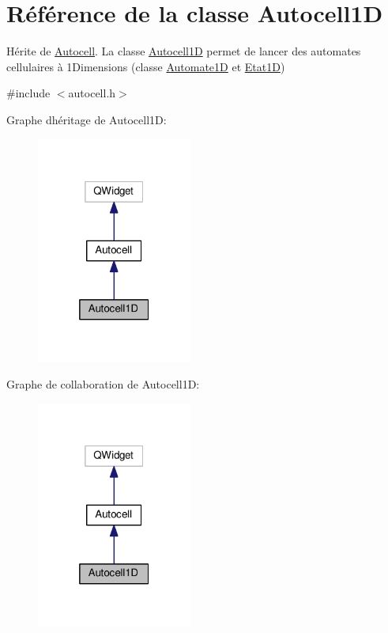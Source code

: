 \hypertarget{class_autocell1_d}{}\section{Référence de la classe Autocell1D}
\label{class_autocell1_d}


Hérite de \hyperlink{class_autocell}{Autocell}. La classe \hyperlink{class_autocell1_d}{Autocell1D} permet de lancer des automates cellulaires à 1\+Dimensions (classe \hyperlink{class_automate1_d}{Automate1D} et \hyperlink{class_etat1_d}{Etat1D})  




{\ttfamily \#include $<$autocell.\+h$>$}



Graphe d\textquotesingle{}héritage de Autocell1D\+:
\nopagebreak
\begin{figure}[H]
\begin{center}
\leavevmode
\includegraphics[width=145pt]{class_autocell1_d__inherit__graph}
\end{center}
\end{figure}


Graphe de collaboration de Autocell1D\+:
\nopagebreak
\begin{figure}[H]
\begin{center}
\leavevmode
\includegraphics[width=145pt]{class_autocell1_d__coll__graph}
\end{center}
\end{figure}
